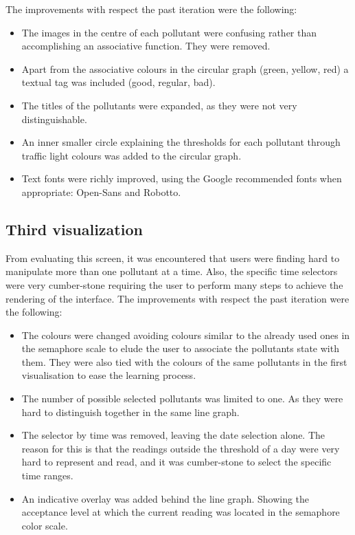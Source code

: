 The improvements with respect the past iteration were the following:
\begin{itemize}
    \item The images in the centre of each pollutant were confusing rather than accomplishing an associative function. They were removed.
    \item Apart from the associative colours in the circular graph (green, yellow, red) a textual tag was included (good, regular, bad).
    \item The titles of the pollutants were expanded, as they were not very distinguishable. 
    \item An inner smaller circle explaining the thresholds for each pollutant through traffic light colours was added to the circular graph. 
    \item Text fonts were richly improved, using the Google recommended fonts when appropriate:  Open-Sans and Robotto.	
\end{itemize}

\subsection{Third visualization}
From evaluating this screen, it was encountered that users were finding hard to manipulate more than one pollutant at a time. Also, the specific time selectors were very cumber-stone requiring the user to perform many steps to achieve the rendering of the interface. 
The improvements with respect the past iteration were the following:
\begin{itemize}
    \item The colours were changed avoiding colours similar to the already used ones in the semaphore scale to elude the user to associate the pollutants state with them. They were also tied with the colours of the same pollutants in the first visualisation to ease the learning process.
    \item The number of possible selected pollutants was limited to one. As they were hard to distinguish together in the same line graph. 
    \item The selector by time was removed, leaving the date selection alone. The reason for this is that the readings outside the threshold of a day were very hard to represent and read, and it was cumber-stone to select the specific time ranges. 
    \item An indicative overlay was added behind the line graph. Showing the acceptance level at which the current reading was located in the semaphore color scale. 
\end{itemize}

